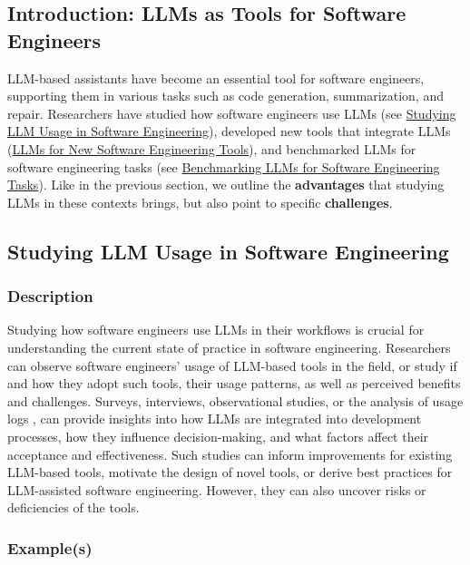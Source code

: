 \subsection{Introduction: LLMs as Tools for Software Engineers}

LLM-based assistants have become an essential tool for software engineers, supporting them in various tasks such as code generation, summarization, and repair.
Researchers have studied how software engineers use LLMs (see \href{/study-types/#studying-llm-usage-in-software-engineering}{Studying LLM Usage in Software Engineering}), developed new tools that integrate LLMs (\href{/study-types/#llms-for-new-software-engineering-tools}{LLMs for New Software Engineering Tools}), and benchmarked LLMs for software engineering tasks  (see \href{/study-types/#benchmarking-llms-for-software-engineering-tasks}{Benchmarking LLMs for Software Engineering Tasks}).
Like in the previous section, we outline the \textbf{advantages} that studying LLMs in these contexts brings, but also point to specific \textbf{challenges}.
\subsection{Studying LLM Usage in Software Engineering}

\subsubsection{Description}

Studying how software engineers use LLMs in their workflows is crucial for understanding the current state of practice in software engineering.
Researchers can observe software engineers' usage of LLM-based tools in the field, or study if and how they adopt such tools, their usage patterns, as well as perceived benefits and challenges.
Surveys, interviews, observational studies, or the analysis of usage logs , can provide insights into how LLMs are integrated into development processes, how they influence decision-making, and what factors affect their acceptance and effectiveness. 
Such studies can inform improvements for existing LLM-based tools, motivate the design of novel tools, or derive best practices for LLM-assisted software engineering.
However, they can also uncover risks or deficiencies of the tools.

\subsubsection{Example(s)}

